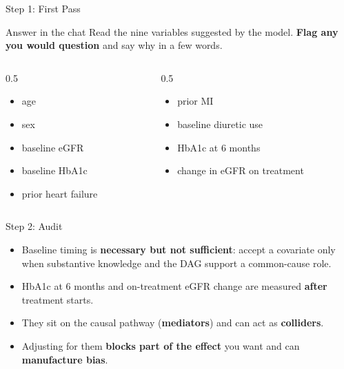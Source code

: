\documentclass[aspectratio=169]{beamer}
\begin{document}
\begin{frame}{Step 1: First Pass}
  \small
  \begin{block}{Answer in the chat}
    Read the nine variables suggested by the model. \textbf{Flag any you would question}
    and say why in a few words.
  \end{block}
  \vspace{0.4em}

  \begin{columns}[T]
    \begin{column}{0.5\textwidth}
      \begin{itemize}
        \item age
        \item sex
        \item baseline eGFR
        \item baseline HbA1c
        \item prior heart failure
      \end{itemize}
    \end{column}
    \begin{column}{0.5\textwidth}
      \begin{itemize}
        \item prior MI
        \item baseline diuretic use
        \item HbA1c at 6 months
        \item change in eGFR on treatment
      \end{itemize}
    \end{column}
  \end{columns}
\end{frame}

\begin{frame}{Step 2: Audit}
  \small
  \begin{itemize}
    \item Baseline timing is \textbf{necessary but not sufficient}: accept a
      covariate only when substantive knowledge and the DAG support a
      common-cause role.
    \item \textcolor{brick}{HbA1c at 6 months} and \textcolor{brick}{on-treatment
      eGFR change} are measured \textbf{after} treatment starts.
    \item They sit on the causal pathway (\textbf{mediators}) and can act as
      \textbf{colliders}.
    \item Adjusting for them \textbf{blocks part of the effect} you want and can
      \textbf{manufacture bias}.
  \end{itemize}
  \vspace{0.5em}
\end{frame}
\end{document}
